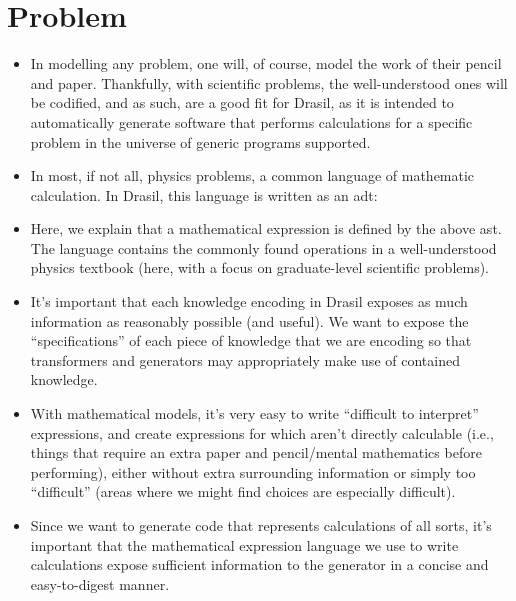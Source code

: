 
\section{Problem}

\begin{itemize}

	\item In modelling any problem, one will, of course, model the work of their
		  pencil and paper. Thankfully, with scientific problems, the
		  well-understood ones will be codified\cite{well-understood}, and as
		  such, are a good fit for Drasil, as it is intended to automatically
		  generate software that performs calculations for a specific problem in
		  the universe of generic programs supported.

	\item In most, if not all, physics problems, a common language of mathematic
	      calculation. In Drasil, this language is written as an \acf{adt}: 
		  
		  \currentExprHaskell

	\item Here, we explain that a mathematical expression is defined by the
	      above \acf{ast}. The language contains the commonly found operations
	      in a well-understood physics textbook (here, with a focus on
	      graduate-level scientific problems).

	\item It's important that each knowledge encoding in Drasil exposes as much
	      information as reasonably possible (and useful).  We want to expose the ``specifications'' of each piece of
	      knowledge that we are encoding so that transformers and generators may
	      appropriately make use of contained knowledge.

	\item With mathematical models, it's very easy to write ``difficult to
	      interpret'' expressions, and create expressions for which aren't
	      directly calculable (i.e., things that require an extra paper and
	      pencil/mental mathematics before performing), either without extra
	      surrounding information or simply too ``difficult'' (areas where we
	      might find choices are especially difficult).

	\item Since we want to generate code that represents calculations of all
	      sorts, it's important that the mathematical expression language we use
	      to write calculations expose sufficient information to the generator
	      in a concise and easy-to-digest manner.


\end{itemize}

